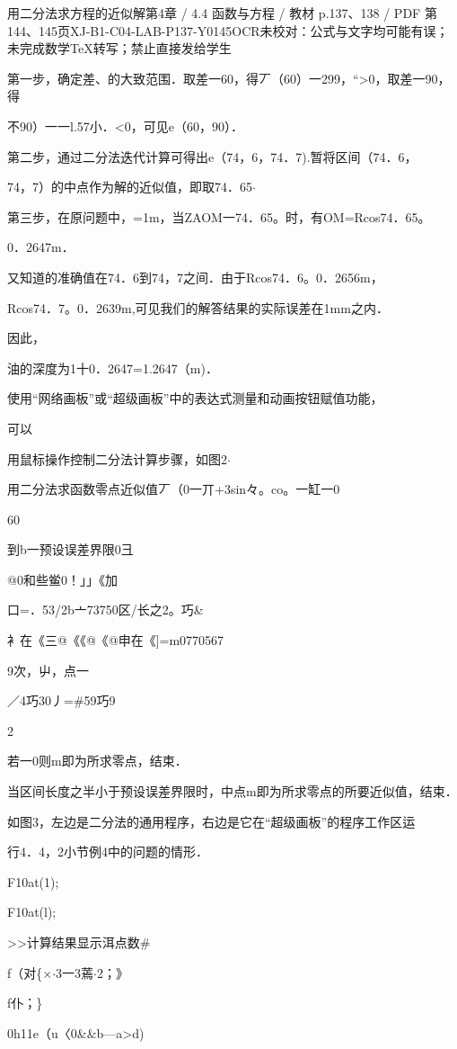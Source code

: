 \begin{bankitem}{用二分法求方程的近似解}{第4章 / 4.4 函数与方程 / 教材 p.137、138 / PDF 第144、145页}{XJ-B1-C04-LAB-P137-Y0145}{OCR未校对：公式与文字均可能有误；未完成数学TeX转写；禁止直接发给学生}
\begin{ocrdraft}
第一步，确定差、的大致范围．取差一60，得丆（60）一299，“>0，取差一90，得
\par
不90）一一l.57小．<0，可见e（60，90）．
\par
第二步，通过二分法迭代计算可得出e（74，6，74．7).暂将区间（74．6，
\par
74，7）的中点作为解的近似值，即取74．65\ensuremath{\cdot}
\par
第三步，在原问题中，=1m，当ZAOM一74．65。时，有OM=Rcos74．65。
\par
[教材p.138 / PDF第145页]
\par
0．2647m．
\par
又知道的准确值在74．6到74，7之间．由于Rcos74．6。0．2656m，
\par
Rcos74．7。0．2639m,可见我们的解答结果的实际误差在1mm之内．
\par
因此，
\par
油的深度为1十0．2647=1.2647（m)．
\par
使用“网络画板”或“超级画板”中的表达式测量和动画按钮赋值功能，
\par
可以
\par
用鼠标操作控制二分法计算步骤，如图2\ensuremath{\cdot}
\par
用二分法求函数零点近似值丆（0一丌+3sin々。co。一缸一0
\par
60
\par
[：@丝云钽1]到b一预设误差界限0彐
\par
@0和些鲎0！」」《加
\par
口=．53/2b亠73750区/长之2。巧\&
\par
衤在《三@《《@《@申在《]=m0770567
\par
9次，屮，点一
\par
／4巧30丿=\#59巧9
\par
2
\par
若一0则m即为所求零点，结束．
\par
当区间长度之半小于预设误差界限时，中点m即为所求零点的所要近似值，结束．
\par
如图3，左边是二分法的通用程序，右边是它在“超级画板”的程序工作区运
\par
行4．4，2小节例4中的问题的情形．
\par
F10at(1);
\par
F10at(l);
\par
>>计算结果显示洱点数\#
\par
f（对\{\ensuremath{\times}\ensuremath{\cdot}3一3蔫\ensuremath{\cdot}2；》
\par
f仆；\}
\par
0h11e（u〈0\&\&b—a>d)

\end{ocrdraft}
\end{bankitem}
